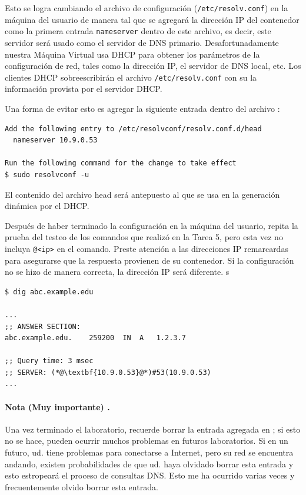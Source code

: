 Esto se logra cambiando el archivo de configuración (\texttt{/etc/resolv.conf}) en la máquina del usuario de manera tal que se agregará la dirección IP del contenedor como la primera entrada \texttt{nameserver} dentro de este archivo, es decir, este servidor será usado como el servidor de DNS primario.
Desafortunadamente nuestra Máquina Virtual usa DHCP para obtener los parámetros de la configuración de red, tales como la dirección IP, el servidor de DNS local, etc. Los clientes DHCP sobreescribirán el archivo \texttt{/etc/resolv.conf} con su la información provista por el servidor DHCP.

Una forma de evitar esto es agregar la siguiente entrada dentro del archivo :

\begin{lstlisting}
Add the following entry to /etc/resolvconf/resolv.conf.d/head
  nameserver 10.9.0.53

Run the following command for the change to take effect
$ sudo resolvconf -u
\end{lstlisting}

El contenido del archivo head será antepuesto al que se usa en la generación dinámica por el DHCP.

Después de haber terminado la configuración en la máquina del usuario, repita la prueba del testeo de los comandos que realizó en la Tarea 5, pero esta vez no incluya \texttt{@<ip>} en el comando. Preste atención a las direcciones IP remarcardas para asegurarse que la respuesta provienen de su contenedor. Si la configuración no se hizo de manera correcta, la dirección IP será diferente.
s
\begin{lstlisting}
$ dig abc.example.edu

...
;; ANSWER SECTION:
abc.example.edu.	259200	IN	A	1.2.3.7

;; Query time: 3 msec
;; SERVER: (*@\textbf{10.9.0.53}@*)#53(10.9.0.53)
...
\end{lstlisting}
 

\paragraph{ Nota (Muy importante) .} 
Una vez terminado el laboratorio, recuerde borrar la entrada agregada en ; si esto no se hace, pueden ocurrir muchos problemas en futuros laboratorios. Si en un futuro, ud. tiene problemas para conectarse a Internet, pero su red se encuentra andando, existen probabilidades de que ud. haya olvidado borrar esta entrada y esto estropeará el proceso de consultas DNS. Esto me ha ocurrido varias veces y frecuentemente olvido borrar esta entrada. 


